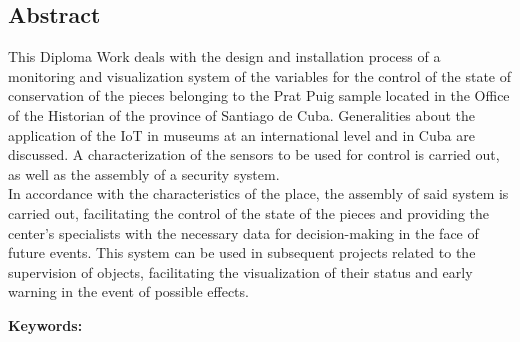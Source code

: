 \begin{center}
    \section*{Abstract}    
\end{center}

This Diploma Work deals with the design and installation process of a monitoring and visualization system of the variables for the control of the state of conservation of the pieces belonging to the Prat Puig sample located in the Office of the Historian of the province of Santiago de Cuba. Generalities about the application of the IoT in museums at an international level and in Cuba are discussed. A characterization of the sensors to be used for control is carried out, as well as the assembly of a security system.\\
In accordance with the characteristics of the place, the assembly of said system is carried out, facilitating the control of the state of the pieces and providing the center's specialists with the necessary data for decision-making in the face of future events. This system can be used in subsequent projects related to the supervision of objects, facilitating the visualization of their status and early warning in the event of possible effects.

\vfill

\begin{flushleft}
    \textbf{Keywords: }
\end{flushleft}